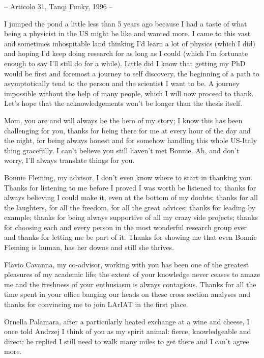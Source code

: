 \documentclass[letterpaper,12pt]{yalephd}
\begin{document}
{\raggedleft -- Articolo 31, Tanqi Funky, 1996 -- \par}
\vspace{0.5cm}



I jumped the pond a little less than 5 years ago because I had a taste of what being a physicist in the US might be like and wanted more.  I came to this vast and sometimes inhospitable land thinking I'd learn a lot of physics (which I did) and hoping I'd keep doing research for as long as I could (which I'm fortunate enough to say I'll still do for a while). Little did I know that getting my PhD would be first and foremost a journey to self discovery, the beginning of a path to asymptotically tend to the person and the scientist I want to be. A journey impossible without the help of many people, which I will now proceed to thank. Let's hope that the acknowledgements won't be longer than the thesis itself.

Mom, you are and will always be the hero of my story; I know this has been challenging for you, thanks for being there for me at every hour of the day and the night, for being always honest and for somehow handling this whole US-Italy thing gracefully. I can't believe you still haven't met Bonnie. Ah, and don't worry, I'll always translate things for you. 

Bonnie Fleming, my advisor, I don't even know where to start in thanking you. Thanks for listening to me before I proved I was worth be listened to; thanks for always believing I could make it, even at the bottom of my doubts; thanks for all the laughters, for all the freedom, for all the great advices; thanks for leading by example; thanks for being always supportive of all my crazy side projects; thanks for choosing each and every person in the most wonderful research group ever and thanks for letting me be part of it. Thanks for showing me that even Bonnie %
Fleming is human, has her downs and still she thrives.

Flavio Cavanna, my co-advisor, working with you has been one of the greatest pleasures of my academic life; the extent of your knowledge never ceases to amaze me and the freshness of your enthusiasm is always contagious. Thanks for all the time spent in your office banging our heads on these cross section analyses and thanks for convincing me to join LArIAT in the first place.

Ornella Palamara, after a particularly heated exchange at a wine and cheese, I once told Andrzej I think of you as my spirit animal: fierce, knowledgeable and direct; he replied I still need to walk many miles to get there and I can't agree more.
\end{document}
